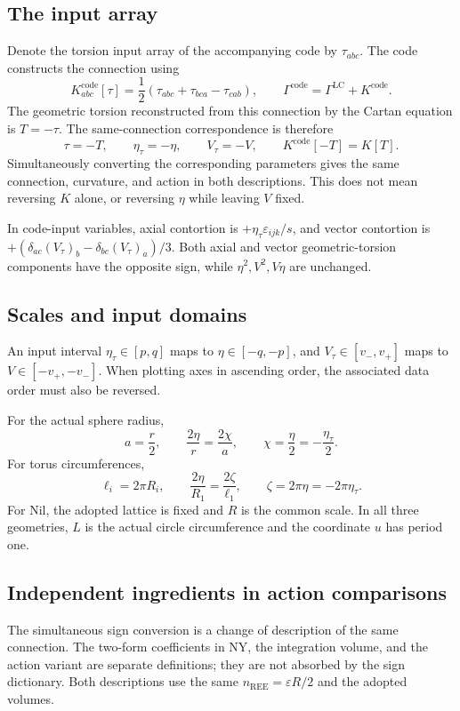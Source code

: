 \subsection{The input array}
Denote the torsion input array of the accompanying code by $\tau_{abc}$.
The code constructs the connection using
\begin{equation}
K^{\mathrm{code}}_{abc}[\tau]
=\frac12(\tau_{abc}+\tau_{bca}-\tau_{cab}),\qquad
\Gamma^{\mathrm{code}}=\Gamma^{\mathrm{LC}}+K^{\mathrm{code}}.
\tag{A-04}\label{eq:A-04}
\end{equation}
The geometric torsion reconstructed from this connection by the Cartan
equation is $T=-\tau$. The same-connection correspondence is therefore
\begin{equation}
\tau=-T,\qquad
\eta_\tau=-\eta,\qquad V_\tau=-V,\qquad
K^{\mathrm{code}}[-T]=K[T].
\tag{A-05}\label{eq:A-05}
\end{equation}
Simultaneously converting the corresponding parameters gives the same
connection, curvature, and action in both descriptions.
This does not mean reversing $K$ alone, or reversing $\eta$ while leaving
$V$ fixed.

In code-input variables, axial contortion is
$+\eta_\tau\varepsilon_{ijk}/s$, and vector contortion is
$+(\delta_{ac}(V_\tau)_b-\delta_{bc}(V_\tau)_a)/3$.
Both axial and vector geometric-torsion components have the opposite
sign, while $\eta^2,V^2,V\eta$ are unchanged.

\subsection{Scales and input domains}
An input interval $\eta_\tau\in[p,q]$ maps to $\eta\in[-q,-p]$,
and $V_\tau\in[v_-,v_+]$ maps to $V\in[-v_+,-v_-]$.
When plotting axes in ascending order, the associated data order
must also be reversed.

For the actual sphere radius,
\begin{equation}
a=\frac r2,\qquad
\frac{2\eta}{r}=\frac{2\chi}{a},\qquad
\chi=\frac{\eta}{2}=-\frac{\eta_\tau}{2}.
\tag{A-06}\label{eq:A-06}
\end{equation}
For torus circumferences,
\begin{equation}
\ell_i=2\pi R_i,\qquad
\frac{2\eta}{R_1}=\frac{2\zeta}{\ell_1},\qquad
\zeta=2\pi\eta=-2\pi\eta_\tau.
\tag{A-07}\label{eq:A-07}
\end{equation}
For Nil, the adopted lattice is fixed and $R$ is the common scale.
In all three geometries, $L$ is the actual circle circumference and
the coordinate $u$ has period one.

\subsection{Independent ingredients in action comparisons}
The simultaneous sign conversion is a change of description of the
same connection. The two-form coefficients in NY, the integration volume,
and the action variant are separate definitions; they are not absorbed
by the sign dictionary. Both descriptions use the same
$n_{\mathrm{REE}}=\varepsilon R/2$ and the adopted volumes.

